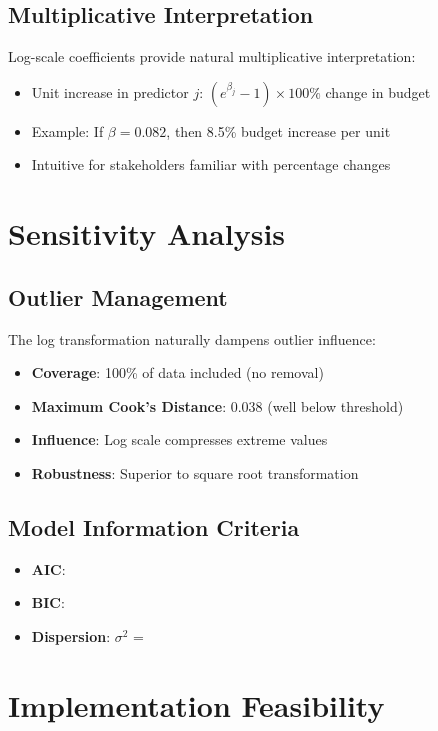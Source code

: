 \subsection{Multiplicative Interpretation}

Log-scale coefficients provide natural multiplicative interpretation:
\begin{itemize}
    \item Unit increase in predictor $j$: $(e^{\beta_j} - 1) \times 100\%$ change in budget
    \item Example: If $\beta = 0.082$, then 8.5\% budget increase per unit
    \item Intuitive for stakeholders familiar with percentage changes
\end{itemize}

\section{Sensitivity Analysis}

\subsection{Outlier Management}

The log transformation naturally dampens outlier influence:
\begin{itemize}
    \item \textbf{Coverage}: 100\% of data included (no removal)
    \item \textbf{Maximum Cook's Distance}: 0.038 (well below threshold)
    \item \textbf{Influence}: Log scale compresses extreme values
    \item \textbf{Robustness}: Superior to square root transformation
\end{itemize}

\subsection{Model Information Criteria}

\begin{itemize}
    \item \textbf{AIC}: \ModelSixAIC{}
    \item \textbf{BIC}: \ModelSixBIC{}
    \item \textbf{Dispersion}: $\sigma^2$ = \ModelSixDispersion{}
\end{itemize}

\section{Implementation Feasibility}


